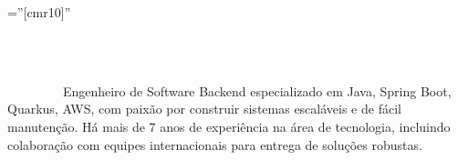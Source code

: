 \documentclass[a4paper,12pt]{article}
\begin{document}

\pagestyle{empty} %

\font\fb=''[cmr10]'' %

\par{
    \\
    \textcolor{white}{\tiny\textbf{Contato}}\\
\par}

\noindent{}

\vspace{-8pt}
\textcolor{white}{\tiny\textbf{Resumo}}
\vspace{-8pt}
\justify
\noindent
{\normalsize Engenheiro de Software Backend especializado em Java, Spring Boot, Quarkus, AWS, com paixão por construir sistemas escaláveis e de fácil manutenção. Há mais de 7 anos de experiência na área de tecnologia, incluindo colaboração com equipes internacionais para entrega de soluções robustas.}
\end{document}
